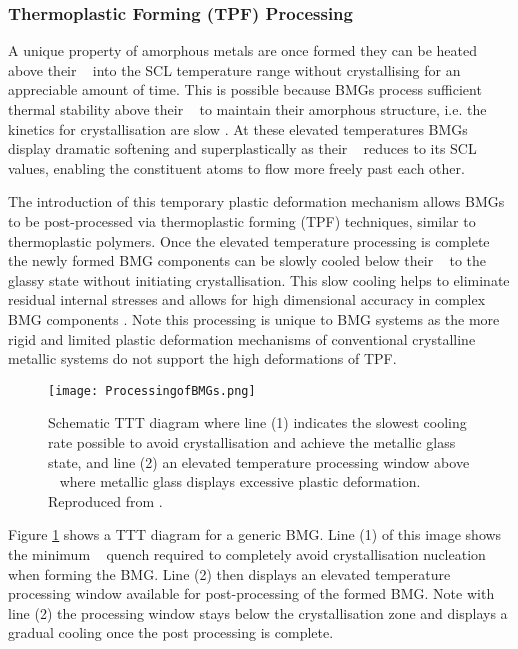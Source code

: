 \documentclass[a4paper,12pt,oneside]{report}%
\begin{document}
\subsubsection{Thermoplastic Forming (TPF) Processing}
A unique property of amorphous metals are once formed they can be heated above their \Tg~ into the SCL temperature range without crystallising for an appreciable amount of time. This is possible because BMGs process sufficient thermal stability above their \Tg~ to maintain their amorphous structure, i.e. the kinetics for crystallisation are slow \cite{Schroers2010}. At these elevated temperatures BMGs display dramatic softening and superplastically as their \n~ reduces to its SCL values, enabling the constituent atoms to flow more freely past each other. 

The introduction of this temporary plastic deformation mechanism allows BMGs to be post-processed via thermoplastic forming (TPF) techniques, similar to thermoplastic polymers. Once the elevated temperature processing is complete the newly formed BMG components can be slowly cooled below their \Tg~  to the glassy state without initiating crystallisation. This slow cooling helps to eliminate residual internal stresses and allows for high dimensional accuracy in complex BMG components \cite{Schroers2010}. Note this processing is unique to BMG systems as the more rigid and limited plastic deformation mechanisms of conventional crystalline metallic systems do not support the high deformations of TPF.

\begin{figure}[htbp]
	\centering
	\texttt{[image: ProcessingofBMGs.png]}
	\caption{Schematic TTT diagram where line (1) indicates the slowest cooling rate possible to avoid crystallisation and achieve the metallic glass state, and line (2) an elevated temperature processing window above \Tg~ where metallic glass displays excessive plastic deformation. Reproduced from \cite{Schroers2010}.}
	\label{fig:BMGTTT}
\end{figure}

Figure \ref{fig:BMGTTT} shows a TTT diagram for a generic BMG. Line (1) of this image shows the minimum \Rc~ quench required to completely avoid crystallisation nucleation when forming the BMG. Line (2) then displays an elevated temperature processing window available for post-processing of the formed BMG. Note with line (2) the processing window stays below the crystallisation zone and displays a gradual cooling once the post processing is complete.
\end{document}
